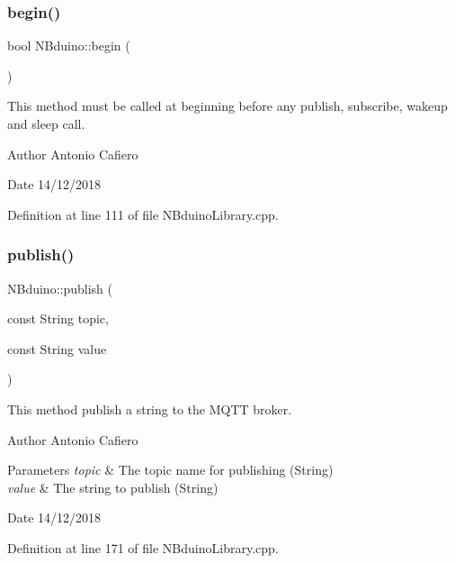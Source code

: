 \subsubsection{\texorpdfstring{begin()}{begin()}}
{\footnotesize\ttfamily bool N\+Bduino\+::begin (\begin{DoxyParamCaption}{ }\end{DoxyParamCaption})}

This method must be called at beginning before any publish, subscribe, wakeup and sleep call. \begin{DoxyAuthor}{Author}
Antonio Cafiero 
\end{DoxyAuthor}
\begin{DoxyDate}{Date}
14/12/2018 
\end{DoxyDate}


Definition at line 111 of file N\+Bduino\+Library.\+cpp.

\mbox{\label{class_n_bduino_a1c9526fbb36956b1cd41e33dd9133394}} 
\subsubsection{\texorpdfstring{publish()}{publish()}}
{\footnotesize\ttfamily N\+Bduino\+::publish (\begin{DoxyParamCaption}\item[{const String}]{topic,  }\item[{const String}]{value }\end{DoxyParamCaption})}

This method publish a string to the M\+Q\+TT broker. \begin{DoxyAuthor}{Author}
Antonio Cafiero 
\end{DoxyAuthor}

\begin{DoxyParams}{Parameters}
{\em topic} & The topic name for publishing (String) \\
\hline
{\em value} & The string to publish (String) \\
\hline
\end{DoxyParams}
\begin{DoxyDate}{Date}
14/12/2018 
\end{DoxyDate}


Definition at line 171 of file N\+Bduino\+Library.\+cpp.

\mbox{\label{class_n_bduino_a3d96fbfb52c89cd55e9a7a3f387c6945}} 
